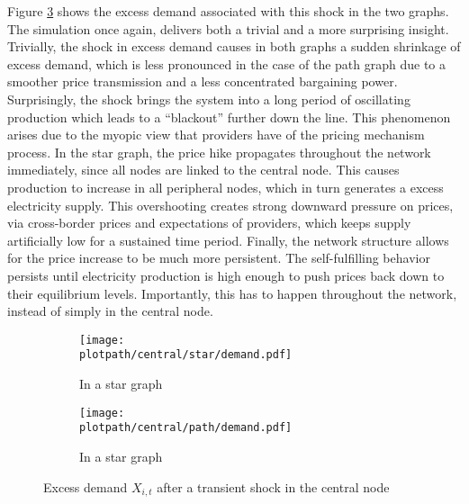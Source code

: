 Figure \ref{fig:demandshock} shows the excess demand associated with this shock in the two graphs. The simulation once again, delivers both a trivial and a more surprising insight. Trivially, the shock in excess demand causes in both graphs a sudden shrinkage of excess demand, which is less pronounced in the case of the path graph due to a smoother price transmission and a less concentrated bargaining power. Surprisingly, the shock brings the system into a long period of oscillating production which leads to a ``blackout'' further down the line. This phenomenon arises due to the myopic view that providers have of the pricing mechanism process. In the star graph, the price hike propagates throughout the network immediately, since all nodes are linked to the central node. This causes production to increase in all peripheral nodes, which in turn generates a excess electricity supply. This overshooting creates strong downward pressure on prices, via cross-border prices and expectations of providers, which keeps supply artificially low for a sustained time period. Finally, the network structure allows for the price increase to be much more persistent. The self-fulfilling behavior persists until electricity production is high enough to push prices back down to their equilibrium levels. Importantly, this has to happen throughout the network, instead of simply in the central node.

\begin{center}
  \begin{figure}[H]
    \begin{subfigure}{0.475\textwidth}
      \centering
      \texttt{[image: \\plotpath/central/star/demand.pdf]}
      \caption{In a star graph} \label{fig:demandshock_star}
    \end{subfigure} \hfill
    \begin{subfigure}{0.475\textwidth}
      \centering
      \texttt{[image: \\plotpath/central/path/demand.pdf]}
      \caption{In a star graph} \label{fig:demandshock_path}
    \end{subfigure}
    \caption{Excess demand $X_{i, t}$ after a transient shock in the central node} \label{fig:demandshock}
  \end{figure}
\end{center}

